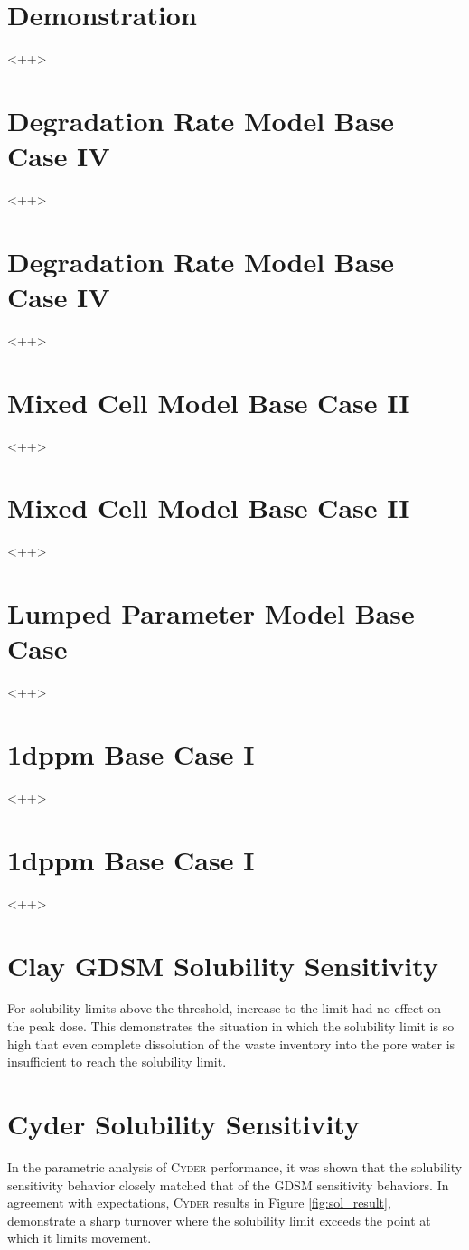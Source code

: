 \documentclass[letterpaper]{article}
\newcommand{\Cyder}{\textsc{Cyder}\xspace}
\begin{document}
{\section{Demonstration}
<++>
\section{Degradation Rate Model Base Case IV}
<++>
\section{Degradation Rate Model Base Case IV}
<++>
\section{Mixed Cell Model Base Case  II}
<++>
\section{Mixed Cell Model Base Case  II}
<++>
\section{Lumped Parameter Model Base Case}
<++>
\section{1dppm Base Case I}
<++>
\section{1dppm Base Case I}
<++>
\section{Clay GDSM Solubility Sensitivity}
For solubility limits above the threshold, increase to the limit had no effect on the peak dose. This demonstrates the 
situation in which the solubility limit is so high that even complete 
dissolution of the waste inventory into the pore water is insufficient to reach 
the solubility limit.
\section{Cyder Solubility Sensitivity}
In the parametric analysis of \Cyder performance, it was shown that the 
solubility sensitivity behavior closely matched that of the GDSM 
sensitivity behaviors. In agreement with expectations, \Cyder results in Figure 
\ref{fig:sol_result}, demonstrate a sharp turnover 
where the solubility limit exceeds the point at which it limits movement. 

}
\end{document}
